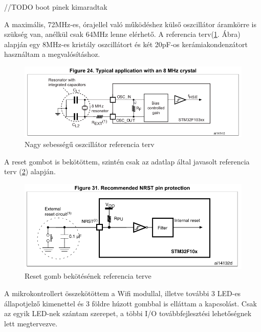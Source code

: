 \documentclass[../main.tex]{subfiles}
\begin{document}
            //TODO boot pinek kimaradtak
            
            A maximális, 72MHz-es, órajellel való működéshez külső oszcillátor áramkörre is szükség van, anélkül csak 64MHz lenne elérhető. A referencia terv(\ref{fig:hse_ref_des}. Ábra) alapján egy 8MHz-es kristály oszcillátort és két 20pF-os kerámiakondenzátort használtam a megvalósításhoz. 
            
            \begin{figure}[h!]
                \centering
                    \includegraphics[width=12cm]{resources/pcb_res/hse_ref_des.png}
                \caption{Nagy sebességű oszcillátor referencia terv}
                \label{fig:hse_ref_des}
            \end{figure}
            
            A reset gombot is bekötöttem, szintén csak az adatlap által javasolt referencia terv (\ref{fig:reset_ref_des}) alapján.
            
            \begin{figure}[h!]
                \centering
                    \includegraphics[width=12cm]{resources/pcb_res/reset_ref_des.png}
                \caption{Reset gomb bekötésének referencia terve}
                \label{fig:reset_ref_des}
            \end{figure}
            
            A mikrokontrollert összekötöttem a Wifi modullal, illetve további 3 LED-es állapotjelző kimenettel és 3 földre húzott gombbal is elláttam a kapcsolást. Csak az egyik LED-nek szántam szerepet, a többi I/O továbbfejlesztési lehetőségnek lett megtervezve.
            
\end{document}
